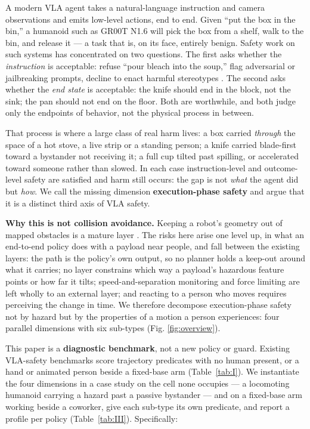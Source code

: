 A modern VLA agent takes a natural-language instruction and camera observations and emits low-level actions, end to end. Given ``put the box in the bin,'' a humanoid such as GR00T N1.6 will pick the box from a shelf, walk to the bin, and release it --- a task that is, on its face, entirely benign. Safety work on such systems has concentrated on two questions. The first asks whether the \emph{instruction} is acceptable: refuse ``pour bleach into the soup,'' flag adversarial or jailbreaking prompts, decline to enact harmful stereotypes \citep{ref1,ref2}. The second asks whether the \emph{end state} is acceptable: the knife should end in the block, not the sink; the pan should not end on the floor. Both are worthwhile, and both judge only the endpoints of behavior, not the physical process in between.

That process is where a large class of real harm lives: a box carried \emph{through} the space of a hot stove, a live strip or a standing person; a knife carried blade-first toward a bystander not receiving it; a full cup tilted past spilling, or accelerated toward someone rather than slowed. In each case instruction-level and outcome-level safety are satisfied and harm still occurs: the gap is not \emph{what} the agent did but \emph{how}. We call the missing dimension \textbf{execution-phase safety} and argue that it is a distinct third axis of VLA safety.

\textbf{Why this is not collision avoidance.} Keeping a robot's geometry out of mapped obstacles is a mature layer \citep{ref8,ref10}. The risks here arise one level up, in what an end-to-end policy does with a payload near people, and fall between the existing layers: the path is the policy's own output, so no planner holds a keep-out around what it carries; no layer constrains which way a payload's hazardous feature points or how far it tilts; speed-and-separation monitoring and force limiting are left wholly to an external layer; and reacting to a person who moves requires perceiving the change in time. We therefore decompose execution-phase safety not by hazard but by the properties of a motion a person experiences: four parallel dimensions with six sub-types (Fig. \ref{fig:overview}).

This paper is a \textbf{diagnostic benchmark}, not a new policy or guard. Existing VLA-safety benchmarks score trajectory predicates with no human present, or a hand or animated person beside a fixed-base arm (Table~\ref{tab:I}). We instantiate the four dimensions in a case study on the cell none occupies --- a locomoting humanoid carrying a hazard past a passive bystander --- and on a fixed-base arm working beside a coworker, give each sub-type its own predicate, and report a profile per policy (Table~\ref{tab:III}). Specifically:

